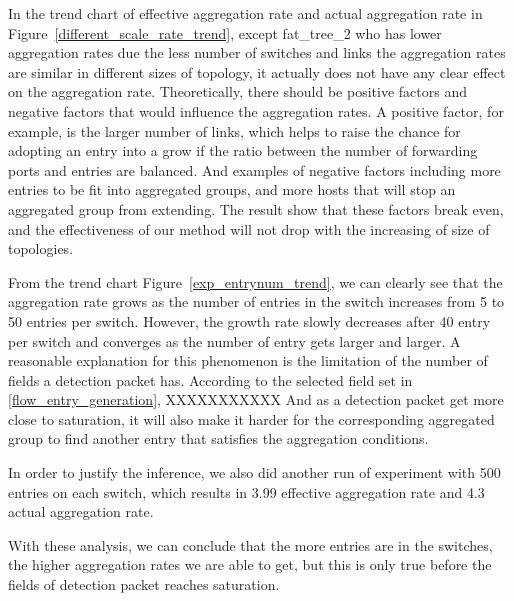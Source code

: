 In the trend chart of effective aggregation rate and actual aggregation rate in Figure~\ref{different_scale_rate_trend}, except fat\_tree\_2 who has lower aggregation rates due the less number of switches and links 
the aggregation rates are similar in different sizes of topology, it actually does not have any clear effect on the aggregation rate. Theoretically, there should be positive factors and negative factors that would influence the aggregation rates. A positive factor, for example, is the larger number of links, which helps to raise the chance for adopting an entry into a grow if the ratio between the number of forwarding ports and entries are balanced. And examples of negative factors including more entries to be fit into aggregated groups, and more hosts that will stop an aggregated group from extending. The result show that these factors break even, and the effectiveness of our method will not drop with the increasing of size of topologies.

From the trend chart Figure~\ref{exp_entrynum_trend}, we can clearly see that the aggregation rate grows as the number of entries in the switch increases from 5 to 50 entries per switch. However, the growth rate slowly decreases after 40 entry per switch and converges as the number of entry gets larger and larger. 
A reasonable explanation for this phenomenon is the limitation of the number of fields a detection packet has. According to the selected field set in \ref{flow_entry_generation}, XXXXXXXXXXX
And as a detection packet get more close to saturation, it will also make it harder for the corresponding aggregated group to find another entry that satisfies the aggregation conditions. 

In order to justify the inference, we also did another run of experiment with 500 entries on each switch, which results in 3.99 effective aggregation rate and 4.3 actual aggregation rate.

With these analysis, we can conclude that the more entries are in the switches, the higher aggregation rates we are able to get, but this is only true before the fields of detection packet reaches saturation. 